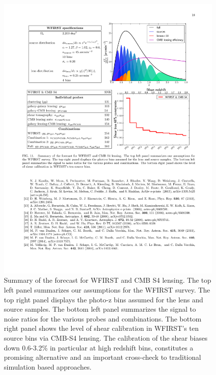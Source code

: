 \begin{figure}
\includegraphics[width=15cm]{Plots/forecasts/CMB-S4-WFIRST}
\caption{Summary of the forecast for WFIRST and CMB S4 lensing. The top left panel summarizes our assumptions for
the WFIRST survey. The top right panel displays the photo-z bins assumed for the lens and source samples. The bottom left
panel summarizes the signal to noise ratios for the various probes and combinations. The bottom right panel shows the level
of shear calibration in WFIRST's ten source bins via CMB-S4 lensing. The calibration of the shear biases down 0.6-3.2\% in particular at high redshift bins, constitutes a promising alternative and an important cross-check to traditional simulation based approaches.}
\label{fi:CMB}
\end{figure}

